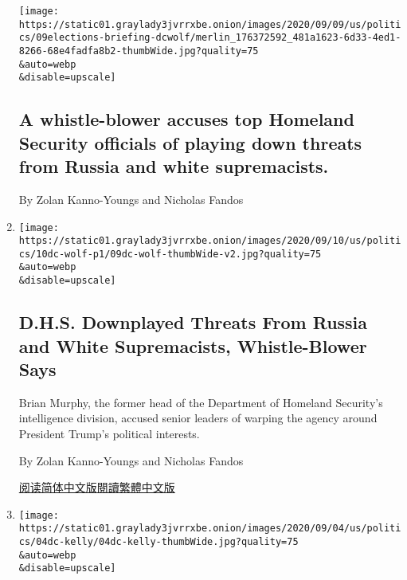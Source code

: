 \begin{enumerate}
  \texttt{[image: https://static01.graylady3jvrrxbe.onion/images/2020/09/09/us/politics/09elections-briefing-dcwolf/merlin\_176372592\_481a1623-6d33-4ed1-8266-68e4fadfa8b2-thumbWide.jpg?quality=75\\\&auto=webp\\\&disable=upscale]}

  \hypertarget{a-whistle-blower-accuses-top-homeland-security-officials-of-playing-down-threats-from-russia-and-white-supremacists}{%
  \subsection{A whistle-blower accuses top Homeland Security officials
  of playing down threats from Russia and white
  supremacists.}\label{a-whistle-blower-accuses-top-homeland-security-officials-of-playing-down-threats-from-russia-and-white-supremacists}}

  By Zolan Kanno-Youngs and Nicholas Fandos
\item
  \href{/2020/09/09/us/politics/homeland-security-russia-trump.html}{}

  \texttt{[image: https://static01.graylady3jvrrxbe.onion/images/2020/09/10/us/politics/10dc-wolf-p1/09dc-wolf-thumbWide-v2.jpg?quality=75\\\&auto=webp\\\&disable=upscale]}

  \hypertarget{dhs-downplayed-threats-from-russia-and-white-supremacists-whistle-blower-says}{%
  \subsection{D.H.S. Downplayed Threats From Russia and White
  Supremacists, Whistle-Blower
  Says}\label{dhs-downplayed-threats-from-russia-and-white-supremacists-whistle-blower-says}}

  Brian Murphy, the former head of the Department of Homeland Security's
  intelligence division, accused senior leaders of warping the agency
  around President Trump's political interests.

  By Zolan Kanno-Youngs and Nicholas Fandos

  \href{https://cn.nytimes3xbfgragh.onion/usa/20200910/homeland-security-russia-trump/}{阅读简体中文版}\href{https://cn.nytimes3xbfgragh.onion/usa/20200910/homeland-security-russia-trump/zh-hant/}{閱讀繁體中文版}
\item
  \href{/2020/09/04/us/politics/kelly-trump.html}{}

  \texttt{[image: https://static01.graylady3jvrrxbe.onion/images/2020/09/04/us/politics/04dc-kelly/04dc-kelly-thumbWide.jpg?quality=75\\\&auto=webp\\\&disable=upscale]}


\end{enumerate}
